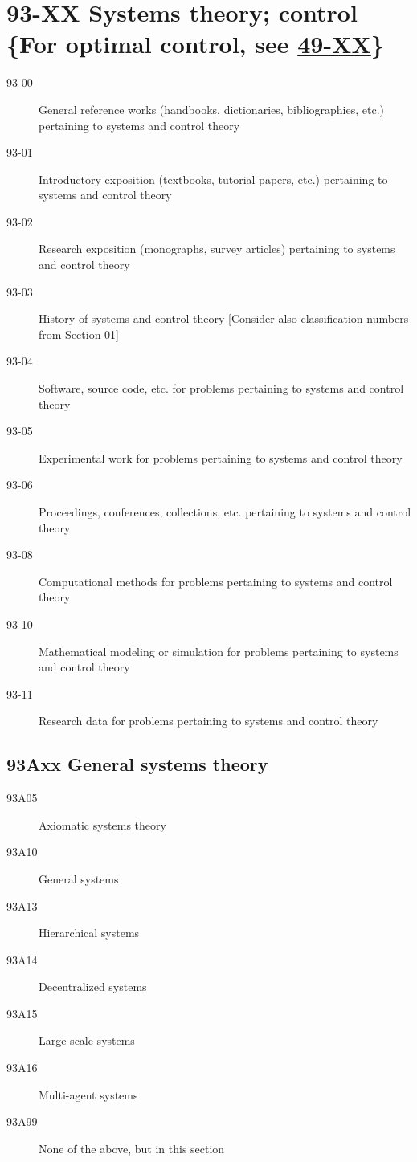 \section*{93-XX Systems theory; control \{For optimal control, see \hyperref[49-XX]{49-XX}\} }\label{93-XX}
\begin{description}
\item [93-00]\label{93-00} General reference works (handbooks, dictionaries, bibliographies, etc.) pertaining to systems and control theory
\item [93-01]\label{93-01}  Introductory exposition (textbooks, tutorial papers, etc.) pertaining to systems and control theory
\item [93-02]\label{93-02} Research exposition (monographs, survey articles) pertaining to systems and control theory
\item [93-03]\label{93-03} History of systems and control theory [Consider also classification numbers from Section \hyperref[01-XX]{01}]
\item [93-04]\label{93-04} Software, source code, etc. for problems pertaining to systems and control theory
\item [93-05]\label{93-05} Experimental work for problems pertaining to systems and control theory
\item [93-06]\label{93-06} Proceedings, conferences, collections, etc. pertaining to systems and control theory
\item [93-08]\label{93-08} Computational methods for problems pertaining to systems and control theory
\item [93-10]\label{93-10} Mathematical modeling or simulation for problems pertaining to systems and control theory
\item [93-11]\label{93-11} Research data for problems pertaining to systems and control theory
\end{description}
\subsection*{93Axx  General systems theory }\label{93Axx}
\begin{description}  
\item [93A05]\label{93A05} Axiomatic systems theory
\item [93A10]\label{93A10} General systems
\item [93A13]\label{93A13} Hierarchical systems
\item [93A14]\label{93A14} Decentralized systems
\item [93A15]\label{93A15} Large-scale systems
\item [93A16]\label{93A16} Multi-agent systems
\item [93A99]\label{93A99} None of the above, but in this section
\end{description}
